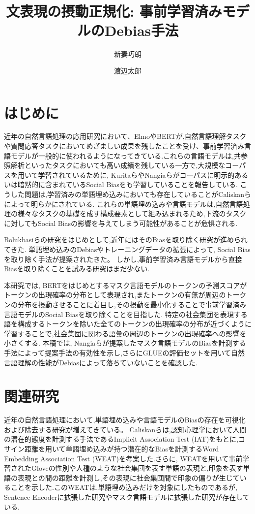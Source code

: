 \documentclass[
  platex, dvipdfmx %
]{nlp2021}
\title{文表現の摂動正規化: 事前学習済みモデルのDebias手法}
\author{新妻巧朗}
\author{渡辺太郎}
\affil{奈良先端科学技術大学院大学 先端科学技術研究科 \\ \texttt{\{niitsuma.takuro.nm3, taro\}@is.naist.jp}}
\begin{document}
\maketitle

\section{はじめに}
近年の自然言語処理の応用研究において、Elmo\cite{Peters:2018}やBERT\cite{devlin2018bert}が,自然言語理解タスクや質問応答タスクにおいてめざましい成果を残したことを受け、事前学習済み言語モデルが一般的に使われるようになってきている.これらの言語モデルは,共参照解析\cite{joshi2019spanbert}といったタスクにおいても高い成績を残している一方で,大規模なコーパスを用いて学習されているために, Kuritaら\cite{kurita2019measuring}やNangiaら\cite{nangia2020crows}がコーパスに明示的あるいは暗黙的に含まれているSocial Biasをも学習していることを報告している.
こうした問題は,学習済みの単語埋め込みにおいても存在していることがCaliskanら\cite{caliskan2017}によって明らかにされている.
これらの単語埋め込みや言語モデルは,自然言語処理の様々なタスクの基礎を成す構成要素として組み込まれるため,下流のタスクに対してもSocial Biasの影響を与えてしまう可能性があることが危惧される.

Bolukbasiら\cite{bolukbasi2016man}の研究をはじめとして,近年にはそのBiasを取り除く研究が進められてきた.
単語埋め込みのDebiasやトレーニングデータの拡張によって, Social Biasを取り除く手法\cite{kaneko-bollegala-2019-gender, zhao-etal-2018-gender, lucas2018}が提案されたきた。
しかし,事前学習済み言語モデルから直接Biasを取り除くことを試みる研究はまだ少ない.

本研究では, BERTをはじめとするマスク言語モデルのトークンの予測スコアがトークンの出現確率の分布として表現され,またトークンの有無が周辺のトークンの分布を摂動させることに着目し,その摂動を最小化することで事前学習済み言語モデルのSocial Biasを取り除くことを目指した.
特定の社会集団を表現する語を構成するトークンを除いた全てのトークンの出現確率の分布が近づくように学習することで,社会集団に関わる語彙の周辺のトークンの出現確率への影響を小さくする.
本稿では, Nangiaら\cite{nangia2020crows}が提案したマスク言語モデルのBiasを計測する手法によって提案手法の有効性を示し,さらにGLUEの評価セットを用いて自然言語理解の性能がDebiasによって落ちていないことを確認した.

\section{関連研究}
近年の自然言語処理において,単語埋め込みや言語モデルのBiasの存在を可視化および除去する研究が増えてきている。
Caliskanら\cite{caliskan2017}は,認知心理学において人間の潜在的態度を計測する手法であるImplicit Association Test (IAT)\cite{Greenwald98measuringindividual}をもとに,コサイン距離を用いて単語埋め込みが持つ潜在的なBiasを計測するWord Embedding Association Test (WEAT)を考案した.さらに, WEATを用いて事前学習されたGlove\cite{pennington2014glove}の性別や人種のような社会集団を表す単語の表現と,印象を表す単語の表現との間の距離を計測し,その表現に社会集団間で印象の偏りが生じていることを示した.このWEATは,単語埋め込みだけを対象にしたものであるが, Sentence Encoderに拡張した研究\cite{may-etal-2019-measuring}やマスク言語モデルに拡張した研究\cite{kurita2019measuring}が存在している.
\end{document}
